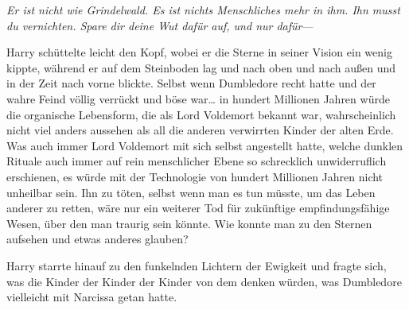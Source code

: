 \emph{Er ist nicht wie Grindelwald. Es ist nichts Menschliches mehr in ihm. Ihn musst du vernichten. Spare dir deine Wut dafür auf, und nur dafür}—

Harry schüttelte leicht den Kopf, wobei er die Sterne in seiner Vision ein wenig kippte, während er auf dem Steinboden lag und nach oben und nach außen und in der Zeit nach vorne blickte. Selbst wenn Dumbledore recht hatte und der wahre Feind völlig verrückt und böse war… in hundert Millionen Jahren würde die organische Lebensform, die als Lord Voldemort bekannt war, wahrscheinlich nicht viel anders aussehen als all die anderen verwirrten Kinder der alten Erde. Was auch immer Lord Voldemort mit sich selbst angestellt hatte, welche dunklen Rituale auch immer auf rein menschlicher Ebene so schrecklich unwiderruflich erschienen, es würde mit der Technologie von hundert Millionen Jahren nicht unheilbar sein. Ihn zu töten, selbst wenn man es tun müsste, um das Leben anderer zu retten, wäre nur ein weiterer Tod für zukünftige empfindungsfähige Wesen, über den man traurig sein könnte. Wie konnte man zu den Sternen aufsehen und etwas anderes glauben?

Harry starrte hinauf zu den funkelnden Lichtern der Ewigkeit und fragte sich, was die Kinder der Kinder der Kinder von dem denken würden, was Dumbledore vielleicht mit Narcissa getan hatte.

